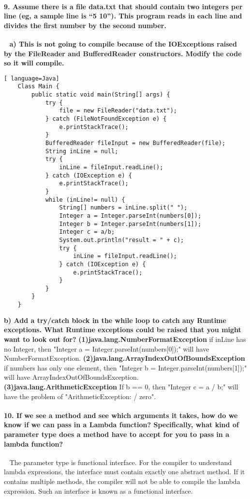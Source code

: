 \documentclass[12pt, leqno]{article}
\begin{document}
\paragraph*{9. Assume there is a file data.txt that should contain two integers per line (eg, a sample line is “5 10”). This program reads in each line and divides the first number by the second number.
}~{}
\newline\indent \textbf{a)	This is not going to compile because of the IOExceptions raised by the FileReader and BufferedReader constructors. Modify the code so it will compile.}
\begin{lstlisting}[ language=Java]
	Class Main {
		public static void main(String[] args) {
			try {
				file = new FileReader("data.txt");
			} catch (FileNotFoundException e) {
				e.printStackTrace();
			}
			BufferedReader fileInput = new BufferedReader(file);
			String inLine = null;
			try {
				inLine = fileInput.readLine();
			} catch (IOException e) {
				e.printStackTrace();
			}
			while (inLine!= null) {
				String[] numbers = inLine.split(" ");
				Integer a = Integer.parseInt(numbers[0]);
				Integer b = Integer.parseInt(numbers[1]);
				Integer c = a/b;
				System.out.println("result = " + c);
				try {
					inLine = fileInput.readLine();
				} catch (IOException e) {
					e.printStackTrace();
				}
			}
		}
	}
\end{lstlisting}
\indent \textbf{b)	Add a try/catch block in the while loop to catch any Runtime exceptions. What Runtime exceptions could be raised that you might want to look out for?}
\newline\indent \textbf{(1)java.lang.NumberFormatException}
\newline\indent\indent if inLine has no Integer, then "Integer a = Integer.parseInt(numbers[0]);" will have NumberFormatException. 
\newline\indent \textbf{(2)java.lang.ArrayIndexOutOfBoundsException}
\newline\indent\indent if numbers has only one element, then "Integer b = Integer.parseInt(numbers[1]);" will have ArrayIndexOutOfBoundsException. 
\newline\indent \textbf{(3)java.lang.ArithmeticException}
\newline\indent\indent If b == 0, then "Integer c = a / b;" will have the problem of "ArithmeticException: / zero".

\paragraph*{10. If we see a method and see which arguments it takes, how do we know if we can pass in a Lambda function? Specifically, what kind of parameter type does a method have to accept for you to pass in a lambda function?
}~{}
\newline\indent The parameter type is functional interface. For the compiler to understand lambda expressions, the interface must contain exactly one abstract method. If it contains multiple methods, the compiler will not be able to compile the lambda expression. Such an interface is known as a functional interface.
\end{document}

